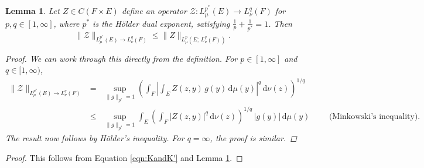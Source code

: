 \documentclass[10pt,a4paper]{amsart}
\newtheorem{lemma}{Lemma}
\begin{document}
\begin{lemma}\label{lem:boundZ}
Let $Z \in C(F \times E)$ define an operator $\mathcal{Z} : L_\mu^{p^*}(E) \to L_\nu^q(F)$ for $p,q \in [1,\infty]$, where $p^*$ is the H\"older dual exponent, satisfying $\tfrac{1}{p} + \tfrac{1}{p^*} = 1$. Then
\begin{equation*}
    \|\mathcal{Z}\|_{L_\mu^{p^*}(E) \to L_\nu^q(F)} \leq \|Z\|_{L_\mu^p\left(E; \, L_\nu^q(F)\right)}.
\end{equation*}
\begin{proof}
    We can work through this directly from the definition. For $p \in [1,\infty]$ and $q \in [1,\infty)$,
        \begin{eqnarray*}
            \|\mathcal{Z}\|_{L_\mu^{p^*}(E) \to L_\nu^q(F)} &=& \sup_{\|g\|_{p^*}=1} \left(\int_F \left| \int_E Z(z,y)\, g(y) \, \mathrm{d}\mu(y) \right|^q \, \mathrm{d} \nu(z)\right)^{1/q} \\
            &\leq& \sup_{\|g\|_{p^*}=1} \int_E \left(\int_F \left|Z(z,y) \right|^q \, \mathrm{d}\nu(z)  \right)^{1/q} \, |g(y)| \, \mathrm{d}\mu(y) \qquad \text{ (Minkowski's inequality)}.
        \end{eqnarray*}
        The result now follows by H\"older's inequality. For $q = \infty$, the proof is similar.
    \end{proof}
\end{lemma}

    \begin{proof}
This follows from Equation \eqref{eqn:KandK'} and Lemma \ref{lem:boundZ}.
    \end{proof}
\end{document}
